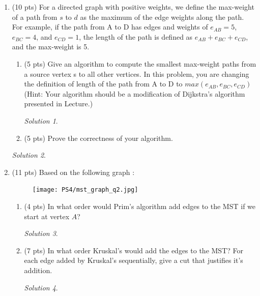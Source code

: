 \documentclass[12pt]{article}
\theoremstyle{remark}
\newtheorem*{solution}{Solution}
\begin{document}
\hrulefill

\newpage
\begin{enumerate}

\item (10 pts) For a directed graph with positive weights, we define the max-weight of a path from $s$ to $d$ as the maximum of the edge weights along the path. For example, if the path from A to D has edges and weights of $e_{AB} = 5$, $e_{BC} = 4$, and $e_{CD}=1$, the length of the path is defined as $e_{AB} + e_{BC} + e_{CD}$, and the max-weight is 5.
\begin{enumerate}
\item(5 pts) Give an algorithm to compute the smallest max-weight paths from a source vertex s to all other vertices. In this problem, you are changing the definition of length of the path from A to D to $max(e_{AB}, e_{BC}, e_{CD})$ (Hint: Your algorithm should be a modification of Dijkstra's algorithm presented in Lecture.)

\begin{solution}

\end{solution}

\pagebreak
\item(5 pts) Prove the correctness of your algorithm.
\end{enumerate}
\begin{solution}

\end{solution}

\pagebreak

\item (11 pts) Based on the following graph :
\begin{figure}[h!]
\begin{center}
\texttt{[image: PS4/mst\_graph\_q2.jpg]} 
\end{center}
\end{figure}

\begin{enumerate}[label=(\alph*)]

\item (4 pts) In what order would Prim's algorithm add edges to the MST if we start at vertex $A$? 
\begin{solution}

\end{solution}
\pagebreak
\item (7 pts) In what order Kruskal's would add the edges to the MST? For each edge added by Kruskal's sequentially, give a cut that justifies it's addition. 
\begin{solution}


\end{solution}
\end{enumerate}
\end{enumerate}
\end{document}

